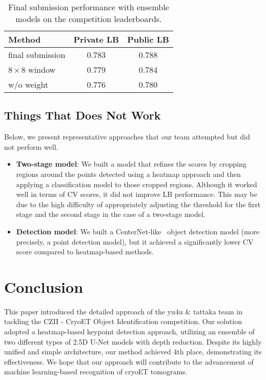 \begin{table}[tb]
    \centering
    \small
    \begin{tabular}{lcc}
        \toprule
        Method & Private LB & Public LB \\
        \midrule
        final submission & 0.783 & 0.788 \\
        $8 \times 8$ window & 0.779 & 0.784 \\
        w/o weight & 0.776 & 0.780 \\
        \bottomrule
    \end{tabular}
    \caption{Final submission performance with ensemble models on the competition leaderboards.}
    \label{tab:results}
\end{table}


\subsection{Things That Does Not Work}
Below, we present representative approaches that our team attempted but did not perform well.

\begin{itemize}
  \item \textbf{Two-stage model}: We built a model that refines the scores by cropping regions around the points detected using a heatmap approach and then applying a classification model to those cropped regions. Although it worked well in terms of CV scores, it did not improve LB performance. This may be due to the high difficulty of appropriately adjusting the threshold for the first stage and the second stage in the case of a two-stage model.
  \item \textbf{Detection model}: We built a CenterNet-like~\cite{Duan2019} object detection model (more precisely, a point detection model), but it achieved a significantly lower CV score compared to heatmap-based methods.
\end{itemize}



\section{Conclusion}
This paper introduced the detailed approach of the yu4u \& tattaka team in tackling the CZII - CryoET Object Identification competition.
Our solution adopted a heatmap-based keypoint detection approach, utilizing an ensemble of two different types of 2.5D U-Net models with depth reduction.
Despite its highly unified and simple architecture, our method achieved 4th place, demonstrating its effectiveness. We hope that our approach will contribute to the advancement of machine learning-based recognition of cryoET tomograms.
